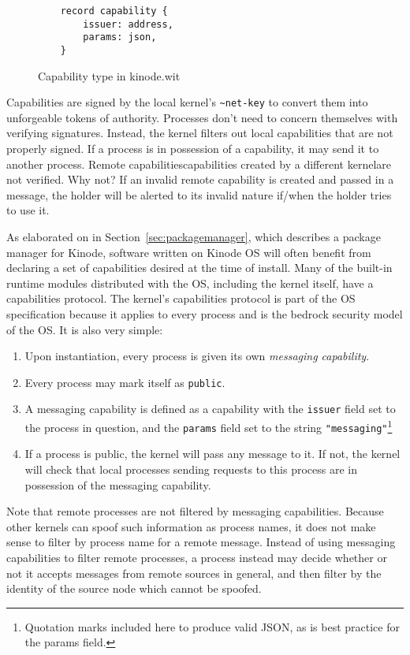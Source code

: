 \documentclass[runningheads]{llncs}
\begin{document}
\begin{figure}[H]
    \centering
    \begin{verbatim}
    record capability {
        issuer: address,
        params: json,
    }
    \end{verbatim}
    \caption{Capability type in kinode.wit}
    \label{fig:WIT Types 3}
\end{figure}

Capabilities are signed by the local kernel's \verb|~net-key| to convert them into unforgeable tokens of authority.
Processes don't need to concern themselves with verifying signatures.
Instead, the kernel filters out local capabilities that are not properly signed.
If a process is in possession of a capability, it may send it to another process.
Remote capabilities\textemdash capabilities created by a different kernel\textemdash are not verified.
Why not?
If an invalid remote capability is created and passed in a message, the holder will be alerted to its invalid nature if/when the holder tries to use it.

As elaborated on in Section~\ref{sec:packagemanager}, which describes a package manager for Kinode, software written on Kinode OS will often benefit from declaring a set of capabilities desired at the time of install.
Many of the built-in runtime modules distributed with the OS, including the kernel itself, have a capabilities protocol.
The kernel's capabilities protocol is part of the OS specification because it applies to every process and is the bedrock security model of the OS.
It is also very simple:
\begin{enumerate}
    \item Upon instantiation, every process is given its own \textit{messaging capability}.
    \item Every process may mark itself as \verb|public|.
    \item A messaging capability is defined as a capability with the \verb|issuer| field set to the process in question, and the \verb|params| field set to the string \verb|"messaging"|\footnote{Quotation marks included here to produce valid JSON, as is best practice for the params field.}
    \item If a process is public, the kernel will pass any message to it. If not, the kernel will check that local processes sending requests to this process are in possession of the messaging capability.
\end{enumerate}

Note that remote processes are not filtered by messaging capabilities.
Because other kernels can spoof such information as process names, it does not make sense to filter by process name for a remote message.
Instead of using messaging capabilities to filter remote processes, a process instead may decide whether or not it accepts messages from remote sources in general, and then filter by the identity of the source node which cannot be spoofed.
\end{document}
